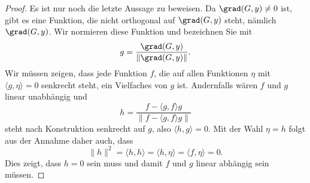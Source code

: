 \begin{proof}
Es ist nur noch die letzte Aussage zu beweisen.
Da $\grad(G,y)\ne 0$ ist, gibt es eine Funktion, die nicht orthogonal
auf $\grad(G,y)$ steht, nämlich $\grad(G,y)$.
Wir normieren diese Funktion und bezeichnen Sie mit
\[
g = \frac{\grad(G,y)}{\|\grad(G,y)\|}.
\]
Wir müssen zeigen, dass jede Funktion $f$, die auf allen Funktionen $\eta$
mit $\langle g,\eta\rangle=0$ senkrecht steht, ein Vielfaches
von $g$ ist.
Andernfalls wären $f$ und $g$ linear unabhängig und 
\[
h
=
\frac{
f-\langle g,f\rangle g
}{
\|f-\langle g,f\rangle g\|
}
\]
steht nach Konstruktion senkrecht auf $g$, also $\langle h,g\rangle=0$.
Mit der Wahl $\eta=h$ folgt aus der Annahme daher auch, dass 
\[
\|h\|^2
=
\langle h,h\rangle
=
\langle h,\eta\rangle
=
\langle f,\eta\rangle
=
0.
\]
Dies zeigt, dass $h=0$ sein muss und damit $f$ und $g$
linear abhängig sein müssen.
\end{proof}

